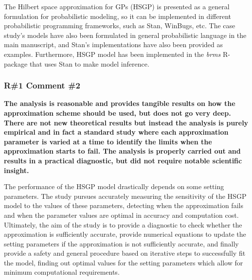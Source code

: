 \documentclass[11pt]{report}
\begin{document}
The Hilbert space approximation for GPs (HSGP) is presented as a general formulation for probabilistic modeling, so it can be implemented in different probabilistic programming frameworks, such as Stan, WinBugs, etc. The case study's models have also been formulated in general probabilistic language in the main manuscript, and Stan's implementations have also been provided as examples. Furthermore, HSGP model has been implemented in the \textit{brms} R-package that uses Stan to make model inference.


\subsubsection*{R\#1 Comment \#2}


\textbf{The analysis is reasonable and provides tangible results on how the approximation scheme should be used, but does not go very deep. There are not new theoretical results but instead the analysis is purely empirical and in fact a standard study where each approximation parameter is varied at a time to identify the limits when the approximation starts to fail. The analysis is properly carried out and results in a practical diagnostic, but did not require notable scientific insight.}

The performance of the HSGP model drastically depends on some setting parameters. The study pursues accurately measuring the sensitivity of the HSGP model to the values of these parameters, detecting when the approximation fails and when the parameter values are optimal in accuracy and computation cost. Ultimately, the aim of the study is to provide a diagnostic to check whether the approximation is sufficiently accurate, provide numerical equations to update the setting parameters if the approximation is not sufficiently accurate, and finally provide a safety and general procedure based on iterative steps to successfully fit the model, finding out optimal values for the setting parameters which allow for minimum computational requirements.
\end{document}
